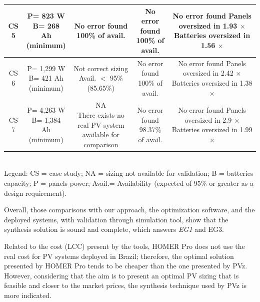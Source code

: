 \documentclass[journal]{IEEEtran}
\begin{document}
\begin{table}
\begin{scriptsize}
\begin{tabular}{c|c|c|c|c}
\hline
CS 5 & \makecell{P= 823 W\\B= 268 Ah\\(minimum)} & \makecell{No error found \\100\% of avail.} & \makecell{No error found \\100\% of avail.} & \makecell{No error found\\Panels oversized in 1.93 $\times$\\Batteries oversized in 1.56 $\times$}\\
\hline
CS 6 & \makecell{P= 1,299 W\\B= 421 Ah\\(minimum)} & \makecell{Not correct sizing \\Avail. $<$ 95\%\\(85.65\%)} & \makecell{No error found \\100\% of avail.} & \makecell{No error found\\Panels oversized in 2.42 $\times$\\Batteries oversized in 1.38 $\times$}\\
\hline
CS 7 & \makecell{P= 4,263 W\\B= 1,384 Ah\\(minimum)} & \makecell{NA\\There exists no real PV system\\available for comparison} & \makecell{No error found \\98.37\% of avail.} & \makecell{No error found\\Panels oversized in 2.9 $\times$\\Batteries oversized in 1.99 $\times$}\\
\hline
\hline
\end{tabular}
\\Legend: CS = case study; NA = sizing not available for validation; B = batteries capacity; P = panels power; Avail.= Availability (expected of 95\% or greater as a design requirement).
\end{scriptsize}
\end{table}

Overall, those comparisons with our approach, the optimization software, and the deployed systems, with validation through simulation tool, show that the synthesis solution is sound and complete, which answers \textit{EG1} and {EG3}.

Related to the cost (LCC) present by the tools, HOMER Pro does not use the real cost for PV systems deployed in Brazil; therefore, the optimal solution presented by HOMER Pro tends to be cheaper than the one presented by PVz. However, considering that the aim is to present an optimal PV sizing that is feasible and closer to the market prices, the synthesis technique used by PVz is more indicated.
\end{document}
